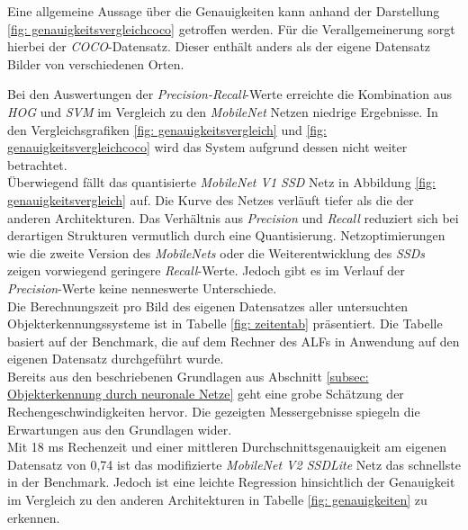 

Eine allgemeine Aussage über die Genauigkeiten kann anhand der Darstellung \ref{fig: genauigkeitsvergleichcoco} getroffen werden. Für die Verallgemeinerung sorgt hierbei der \textit{COCO}-Datensatz. Dieser enthält anders als der eigene Datensatz Bilder von verschiedenen Orten.     






Bei den Auswertungen der \textit{Precision-Recall}-Werte erreichte die Kombination aus \textit{HOG} und \textit{SVM} im Vergleich zu den \textit{MobileNet} Netzen niedrige Ergebnisse. In den Vergleichsgrafiken \ref{fig: genauigkeitsvergleich} und \ref{fig: genauigkeitsvergleichcoco} wird das System aufgrund dessen nicht weiter betrachtet.\\

Überwiegend fällt das quantisierte \textit{MobileNet V1 SSD} Netz in Abbildung \ref{fig: genauigkeitsvergleich} auf. Die Kurve des Netzes verläuft tiefer als die der anderen Architekturen. Das Verhältnis aus \textit{Precision} und \textit{Recall} reduziert sich bei derartigen Strukturen vermutlich durch eine Quantisierung. Netzoptimierungen wie die zweite Version des \textit{MobileNets} oder die Weiterentwicklung des \textit{SSDs} zeigen vorwiegend geringere \textit{Recall}-Werte. Jedoch gibt es im Verlauf der \textit{Precision}-Werte keine nenneswerte Unterschiede. \\

Die Berechnungszeit pro Bild des eigenen Datensatzes aller untersuchten Objekterkennungssysteme ist in Tabelle \ref{fig: zeitentab} präsentiert. Die Tabelle basiert auf der Benchmark, die auf dem Rechner des ALFs in Anwendung auf den eigenen Datensatz durchgeführt wurde.\\





Bereits aus den beschriebenen Grundlagen aus Abschnitt \ref{subsec: Objekterkennung durch neuronale Netze} geht eine grobe Schätzung der Rechengeschwindigkeiten hervor. Die gezeigten Messergebnisse spiegeln die Erwartungen aus den Grundlagen wider.\\





Mit 18 ms Rechenzeit und einer mittleren Durchschnittsgenauigkeit am eigenen Datensatz von 0,74 ist das modifizierte \textit{MobileNet V2 SSDLite} Netz das schnellste in der Benchmark. Jedoch ist eine leichte Regression hinsichtlich der Genauigkeit im Vergleich zu den anderen Architekturen in Tabelle \ref{fig: genauigkeiten} zu erkennen.  




